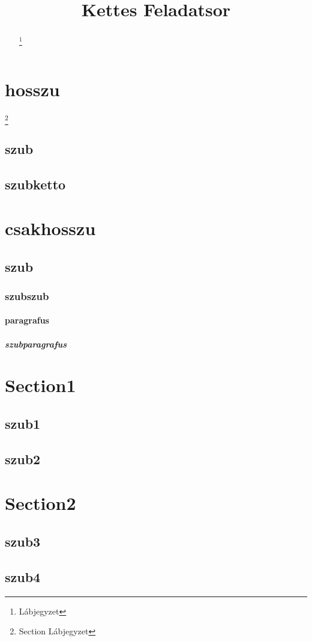 \documentclass[twocolumn]{article}
\begin{document}
\pagestyle{headings}
\setcounter{tocdepth}{5}
\title{Kettes Feladatsor}
\maketitle
{}
\begin{abstract}
\hulipsum[2]
\footnote{Lábjegyzet}
\end{abstract}
\tableofcontents
\newpage
{}
\section[rovid]{hosszu}
\renewcommand{\thefootnote}{\fnsymbol{footnote}}
\footnote{Section Lábjegyzet}
\subsection{szub}
\hulipsum
\subsection{szubketto}
\hulipsum
\setcounter{secnumdepth}{5}
\section{csakhosszu}
\subsection{szub}
\subsubsection{szubszub}
\paragraph{paragrafus}
\subparagraph{szubparagrafus}
\appendix
\section{Section1}
\subsection{szub1}
\pagestyle{myheadings}
\quote
\hulipsum[2]
\subsection{szub2}
\quotation
\hulipsum[2]
\section{Section2}
\subsection{szub3}
\begin{verse}
\hulipsum[2]
\end{verse}
\subsection{szub4}
\end{document}
